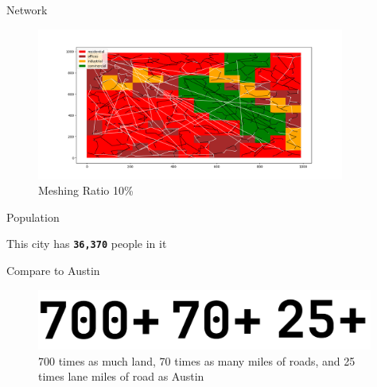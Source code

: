 \documentclass[10pt, aspectratio=169]{beamer}
\begin{document}
    \begin{frame}{Network}
        \begin{center}
            \begin{figure}
                \centering
                \includegraphics[height=5cm, keepaspectratio]{images/build_city/links.png}
                \caption{Meshing Ratio 10\%}
            \end{figure}
        \end{center}
    \end{frame}
    
    \begin{frame}{Population}
        \begin{center}
            \Huge This city has \texttt{\textbf{36,370}} people in it
        \end{center}
    \end{frame}
    
    \begin{frame}{Compare to Austin}
        \begin{center}
            \begin{figure}
                \centering
                \includegraphics[height=2cm, keepaspectratio]{images/build_city/stats.png}
                \caption{700 times as much land, 70 times as many miles of roads, and 25 times lane miles of road as Austin}
            \end{figure}
        \end{center}
    \end{frame}
    
\end{document}
